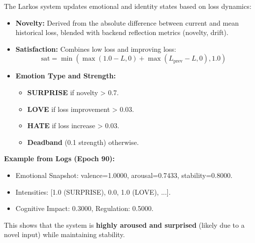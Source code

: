 \documentclass[12pt]{article}
\begin{document}
The Larkos system updates emotional and identity states based on loss
dynamics:
\begin{itemize}
    \item \textbf{Novelty:}
    Derived from the absolute difference between current and mean
    historical loss, blended with backend reflection metrics (novelty,
    drift).
    \item \textbf{Satisfaction:}
    Combines low loss and improving loss:
    \begin{equation}
        \text{sat} = \min(\max(1.0 - L, 0) +
        \max(L_{\text{prev}} - L, 0), 1.0)
    \end{equation}
    \item \textbf{Emotion Type and Strength:}
    \begin{itemize}
        \item \textbf{SURPRISE} if novelty > 0.7.
        \item \textbf{LOVE} if loss improvement > 0.03.
        \item \textbf{HATE} if loss increase > 0.03.
        \item \textbf{Deadband} (0.1 strength) otherwise.
    \end{itemize}
\end{itemize}

\textbf{Example from Logs (Epoch 90):}
\begin{itemize}
    \item Emotional Snapshot: valence=1.0000, arousal=0.7433,
    stability=0.8000.
    \item Intensities: [1.0 (SURPRISE), 0.0, 1.0 (LOVE), ...].
    \item Cognitive Impact: 0.3000, Regulation: 0.5000.
\end{itemize}

This shows that the system is \textbf{highly aroused and surprised}
(likely due to a novel input) while maintaining stability.
\end{document}
